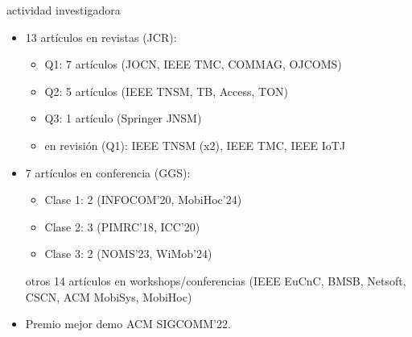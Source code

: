 \documentclass[xcolor=table,xcolor=x11names]{beamer}
\begin{document}
\begin{frame}{\secname}{actividad investigadora}
    \begin{itemize}
        \item 13 artículos en revistas (JCR):
        \begin{itemize}
            \item Q1: 7 artículos (JOCN, IEEE TMC, COMMAG, OJCOMS)
            \item Q2: 5 artículos (IEEE TNSM, TB, Access, TON)
            \item Q3: 1 artículo (Springer JNSM)
            \item en revisión (Q1): IEEE TNSM (x2), IEEE TMC, IEEE IoTJ
        \end{itemize}


        \item 7 artículos en conferencia (GGS):
        \begin{itemize}
            \item Clase 1: 2 (INFOCOM'20, MobiHoc'24)
            \item Clase 2: 3 (PIMRC'18, ICC'20)
            \item Clase 3: 2 (NOMS'23, WiMob'24)
        \end{itemize}
        otros 14 artículos en workshops/conferencias
        (IEEE EuCnC, BMSB, Netsoft, CSCN, ACM MobiSys, MobiHoc)

        \item Premio mejor demo ACM SIGCOMM'22.
    \end{itemize}
\end{frame}
\end{document}
